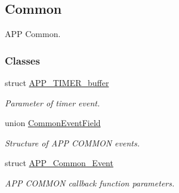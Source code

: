 \hypertarget{group___a_p_p___c_o_m_m_o_n}{}\subsection{Common}
\label{group___a_p_p___c_o_m_m_o_n}


A\+PP Common.  


\subsubsection*{Classes}
\begin{DoxyCompactItemize}
\item 
struct \hyperlink{struct_a_p_p___t_i_m_e_r__buffer}{A\+P\+P\+\_\+\+T\+I\+M\+E\+R\+\_\+buffer}
\begin{DoxyCompactList}\small\item\em Parameter of timer event. \end{DoxyCompactList}\item 
union \hyperlink{union_common_event_field}{Common\+Event\+Field}
\begin{DoxyCompactList}\small\item\em Structure of A\+PP C\+O\+M\+M\+ON events. \end{DoxyCompactList}\item 
struct \hyperlink{struct_a_p_p___common___event}{A\+P\+P\+\_\+\+Common\+\_\+\+Event}
\begin{DoxyCompactList}\small\item\em A\+PP C\+O\+M\+M\+ON callback function parameters. \end{DoxyCompactList}\end{DoxyCompactItemize}
